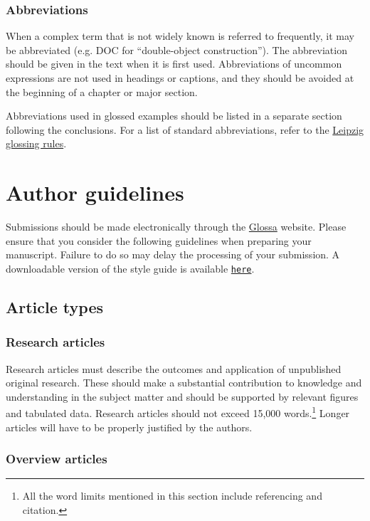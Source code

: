 \documentclass[charis,linguex]{glossa}
\begin{document}
\subsubsection{Abbreviations}
When a complex term that is not widely known is referred to frequently, it may be abbreviated (e.g. DOC for ``double-object construction''). The abbreviation should be given in the text when it is first used. Abbreviations of uncommon expressions are not used in headings or captions, and they should be avoided at the beginning of a chapter or major section.

Abbreviations used in glossed examples should be listed in a separate section following the conclusions. For a list of standard abbreviations, refer to the \href{https://www.eva.mpg.de/lingua/resources/glossing-rules.php}{Leipzig glossing rules}. 


\section{Author guidelines}

\sloppy
Submissions should be made electronically through the \href{http://glossa.ubiquitypress.com}{Glossa} website. Please ensure that you consider the following guidelines when preparing your manuscript. Failure to do so may delay the processing of your submission. A downloadable version of the style guide is available \texttt{\href{http://glossa.ubiquitypress.com}{here}}. 

\fussy

\subsection{Article types}

\subsubsection{Research articles}

Research articles must describe the outcomes and application of unpublished original research. These should make a substantial contribution to knowledge and understanding in the subject matter and should be supported by relevant figures and tabulated data. Research articles should not exceed 15,000 words.\footnote{All the word limits mentioned in this section include referencing and citation.} Longer articles will have to be properly justified by the authors.

\subsubsection{Overview articles}
\end{document}
